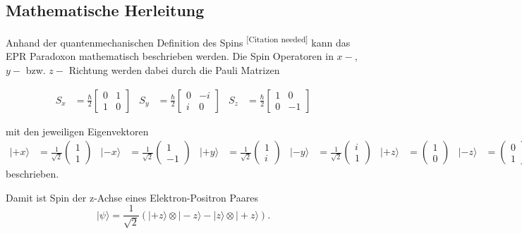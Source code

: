 \begin{refsection}
\subsection{Mathematische Herleitung}
Anhand der quantenmechanischen Definition des Spins
\textsuperscript{[Citation needed]}
kann das EPR Paradoxon mathematisch beschrieben werden.
Die Spin Operatoren in $x-$, $y-$ bzw. $z-$ Richtung werden dabei durch
die Pauli Matrizen 

\begin{align*}
    S_x &= \frac{\hbar}{2} \begin{bmatrix}
    0 & 1 \\ 1 & 0
    \end{bmatrix}
    &
    S_y &= \frac{\hbar}{2} \begin{bmatrix}
    0 & -i \\ i & 0
    \end{bmatrix}
    &
    S_z &= \frac{\hbar}{2} \begin{bmatrix}
    1 & 0 \\ 0 & -1
    \end{bmatrix}
\end{align*}

mit den jeweiligen Eigenvektoren
\begin{align*}
    |{+}x\rangle &= \frac{1}{\sqrt{2}}\begin{pmatrix} 1\\1 \end{pmatrix} &
    |{-}x\rangle &= \frac{1}{\sqrt{2}}\begin{pmatrix} 1\\-1 \end{pmatrix} &
    |{+}y\rangle &= \frac{1}{\sqrt{2}}\begin{pmatrix} 1\\i \end{pmatrix} &
    |{-}y\rangle &= \frac{1}{\sqrt{2}}\begin{pmatrix} i\\1 \end{pmatrix} &
    |{+}z\rangle &= \begin{pmatrix} 1\\0 \end{pmatrix} &
    |{-}z\rangle &= \begin{pmatrix} 0\\1 \end{pmatrix} &
\end{align*}
beschrieben.

Damit ist Spin der z-Achse eines Elektron-Positron Paares
\begin{equation}
    |\psi\rangle = \frac{1}{\sqrt{2}} \left( 
        |{+}z\rangle \otimes |{-}z\rangle - |{}z\rangle \otimes |{+}z\rangle
     \right).
\end{equation}


\end{refsection}

